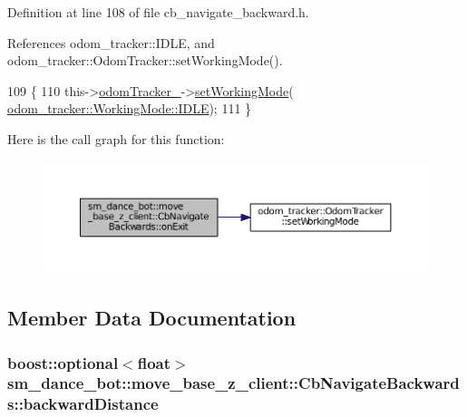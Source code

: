 Definition at line 108 of file cb\+\_\+navigate\+\_\+backward.\+h.



References odom\+\_\+tracker\+::\+I\+D\+LE, and odom\+\_\+tracker\+::\+Odom\+Tracker\+::set\+Working\+Mode().


\begin{DoxyCode}
109     \{
110         this->\hyperlink{classsm__dance__bot_1_1move__base__z__client_1_1CbNavigateBackwards_acccdc0dd0d8810193f85a6bbbbe7effb}{odomTracker\_}->\hyperlink{classodom__tracker_1_1OdomTracker_ac001a40d1107ef0d88aa7db03cafb08c}{setWorkingMode}(
      \hyperlink{namespaceodom__tracker_a4daf27fd157b1a481fdfd6f90de00b88aa5daf7f2ebbba4975d61dab1c40188c7}{odom\_tracker::WorkingMode::IDLE});
111     \}
\end{DoxyCode}


Here is the call graph for this function\+:
\nopagebreak
\begin{figure}[H]
\begin{center}
\leavevmode
\includegraphics[width=350pt]{classsm__dance__bot_1_1move__base__z__client_1_1CbNavigateBackwards_ac8df393df2ed88d8a7660579d2bc0c01_cgraph}
\end{center}
\end{figure}




\subsection{Member Data Documentation}
\subsubsection[{\texorpdfstring{backward\+Distance}{backwardDistance}}]{\setlength{\rightskip}{0pt plus 5cm}boost\+::optional$<$float$>$ sm\+\_\+dance\+\_\+bot\+::move\+\_\+base\+\_\+z\+\_\+client\+::\+Cb\+Navigate\+Backwards\+::backward\+Distance}\hypertarget{classsm__dance__bot_1_1move__base__z__client_1_1CbNavigateBackwards_a4067b6379c6f1c8e7d6d90a1206e98f8}{}\label{classsm__dance__bot_1_1move__base__z__client_1_1CbNavigateBackwards_a4067b6379c6f1c8e7d6d90a1206e98f8}


